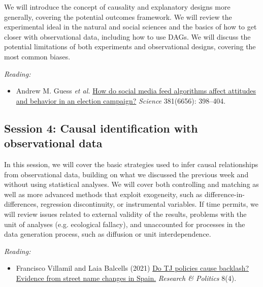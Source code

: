 \documentclass[12pt, a4paper]{article}
\begin{document}
We will introduce the concept of causality and explanatory designs more generally, covering the potential outcomes framework. We will review the experimental ideal in the natural and social sciences and the basics of how to get closer with observational data, including how to use DAGs. We will discuss the potential limitations of both experiments and observational designs, covering the most common biases.

\vspace{15pt}\noindent\textit{Reading:}

\begin{itemize}
  \item Andrew M. Guess \textit{et al.} \href{https://www.science.org/doi/10.1126/science.abp9364}{How do social media feed algorithms affect attitudes and behavior in an election campaign?} \textit{Science} 381(6656): 398--404.
\end{itemize}


\subsection*{Session 4: Causal identification with observational data}

In this session, we will cover the basic strategies used to infer causal relationships from observational data, building on what we discussed the previous week and without using statistical analyses. We will cover both controlling and matching as well as more advanced methods that exploit exogeneity, such as difference-in-differences, regression discontinuity, or instrumental variables. If time permits, we will review issues related to external validity of the results, problems with the unit of analyses (e.g. ecological fallacy), and unaccounted for processes in the data generation process, such as diffusion or unit interdependence.

\vspace{15pt}\noindent\textit{Reading:}

\begin{itemize}
  \item Francisco Villamil and Laia Balcells (2021) \href{https://doi.org/10.1177/20531680211058550}{Do TJ policies cause backlash? Evidence from street name changes in Spain.} \textit{Research \& Politics} 8(4).
\end{itemize}

\end{document}

